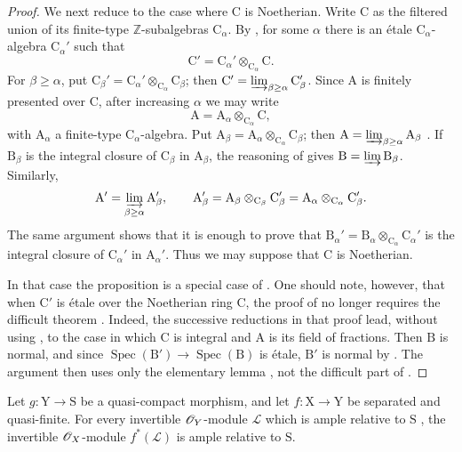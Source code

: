 \begin{proof}
We next reduce to the case where $\mathrm{C}$ is Noetherian. Write $\mathrm{C}$ as the filtered union of its finite-type $\mathbb{Z}$-subalgebras $\mathrm{C}_\alpha$. By , for some $\alpha$ there is an \'etale $\mathrm{C}_\alpha$-algebra $\mathrm{C}_\alpha'$ such that
\[
  \mathrm{C}'=\mathrm{C}_\alpha'\otimes_{\mathrm{C}_\alpha}\mathrm{C}.
\]
For $\beta\geq\alpha$, put $\mathrm{C}_\beta'=\mathrm{C}_\alpha'\otimes_{\mathrm{C}_\alpha}\mathrm{C}_\beta$; then $\mathrm{C}'=\varinjlim_{\beta\geq\alpha}\mathrm{C}_\beta'$. Since $\mathrm{A}$ is finitely presented over $\mathrm{C}$, after increasing $\alpha$ we may write
\[
  \mathrm{A}=\mathrm{A}_\alpha\otimes_{\mathrm{C}_\alpha}\mathrm{C},
\]
with $\mathrm{A}_\alpha$ a finite-type $\mathrm{C}_\alpha$-algebra. Put $\mathrm{A}_\beta=\mathrm{A}_\alpha\otimes_{\mathrm{C}_\alpha}\mathrm{C}_\beta$; then $\mathrm{A}=\varinjlim_{\beta\geq\alpha}\mathrm{A}_\beta$ . If $\mathrm{B}_\beta$ is the integral closure of $\mathrm{C}_\beta$ in $\mathrm{A}_\beta$, the reasoning of  gives $\mathrm{B}=\varinjlim\mathrm{B}_\beta$. Similarly,
\[
  \mathrm{A}'=\varinjlim_{\beta\geq\alpha}\mathrm{A}_\beta',
  \qquad
  \mathrm{A}_\beta'
   =\mathrm{A}_\beta\otimes_{\mathrm{C}_\beta}\mathrm{C}_\beta'
   =\mathrm{A}_\alpha\otimes_{\mathrm{C}_\alpha}\mathrm{C}_\beta'.
\]
The same argument shows that it is enough to prove that $\mathrm{B}_\alpha'=\mathrm{B}_\alpha\otimes_{\mathrm{C}_\alpha}\mathrm{C}_\alpha'$ is the integral closure of $\mathrm{C}_\alpha'$ in $\mathrm{A}_\alpha'$. Thus we may suppose that $\mathrm{C}$ is Noetherian.

In that case the proposition is a special case of . One should note, however, that when $\mathrm{C}'$ is \'etale over the Noetherian ring $\mathrm{C}$, the proof of  no longer requires the difficult theorem . Indeed, the successive reductions in that proof lead, without using , to the case in which $\mathrm{C}$ is integral and $\mathrm{A}$ is its field of fractions. Then $\mathrm{B}$ is normal, and since $\operatorname{Spec}(\mathrm{B}')\to\operatorname{Spec}(\mathrm{B})$ is \'etale, $\mathrm{B}'$ is normal by . The argument then uses only the elementary lemma , not the difficult part of .
\end{proof}

\begin{proposition}[18.12.16]
\label{IV.18.12.16}
Let $g:\mathrm{Y}\to\mathrm{S}$ be a quasi-compact morphism, and let $f:\mathrm{X}\to\mathrm{Y}$ be separated and quasi-finite.
For every invertible $\mathscr{O}_Y$-module $\mathscr{L}$ which is ample relative to $\mathrm{S}$ , the invertible $\mathscr{O}_X$-module $f^*(\mathscr{L})$ is ample relative to $\mathrm{S}$.
\end{proposition}

